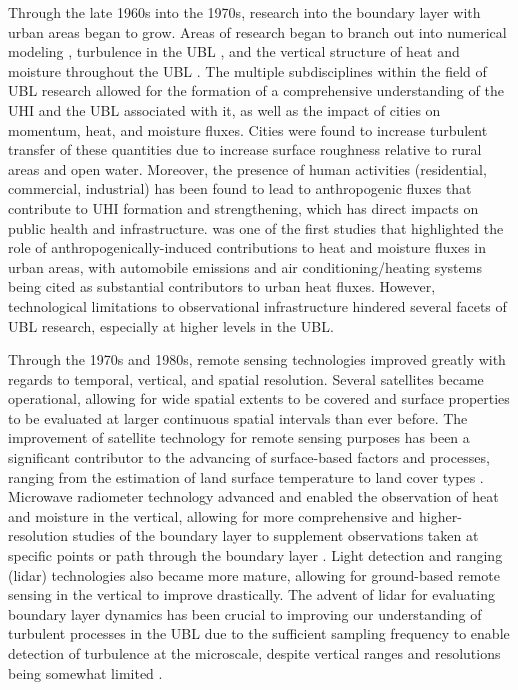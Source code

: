 Through the late 1960s into the 1970s, research into the boundary layer with urban areas began to grow. Areas of research began to branch out into numerical modeling \citep{raman1975physical, atwater1972thermal, yu1975numerical, myrup1969numerical}, turbulence in the UBL \citep{bowne1970observational, gutman1975response, brook1975note}, and the vertical structure of heat and moisture throughout the UBL \citep{hage1975urban, oke1976distinction}. The multiple subdisciplines within the field of UBL research allowed for the formation of a comprehensive understanding of the UHI and the UBL associated with it, as well as the impact of cities on momentum, heat, and moisture fluxes. Cities were found to increase turbulent transfer of these quantities due to increase surface roughness relative to rural areas and open water. Moreover, the presence of human activities (residential, commercial, industrial) has been found to lead to anthropogenic fluxes that contribute to UHI formation and strengthening, which has direct impacts on public health and infrastructure. \citet{oke1975urban} was one of the first studies that highlighted the role of anthropogenically-induced contributions to heat and moisture fluxes in urban areas, with automobile emissions and air conditioning/heating systems being cited as substantial contributors to urban heat fluxes. However, technological limitations to observational infrastructure hindered several facets of UBL research, especially at higher levels in the UBL.

Through the 1970s and 1980s, remote sensing technologies improved greatly with regards to temporal, vertical, and spatial resolution. Several satellites became operational, allowing for wide spatial extents to be covered and surface properties to be evaluated at larger continuous spatial intervals than ever before. The improvement of satellite technology for remote sensing purposes has been a significant contributor to the advancing of surface-based factors and processes, ranging from the estimation of land surface temperature \citep{
carlson1977potential, henderson1980albedo, legeckis1978survey} to land cover types \citep{allan1980remote, townshend1987characterization}. Microwave radiometer technology advanced and enabled the observation of heat and moisture in the vertical, allowing for more comprehensive and higher-resolution studies of the boundary layer to supplement observations taken at specific points or path through the boundary layer \citep{
martner1993evaluation, frisch1995measurement}. Light detection and ranging (lidar) technologies also became more mature, allowing for ground-based remote sensing in the vertical to improve drastically. The advent of lidar for evaluating boundary layer dynamics has been crucial to improving our understanding of turbulent processes in the UBL due to the sufficient sampling frequency to enable detection of turbulence at the microscale, despite vertical ranges and resolutions being somewhat limited \citep{kunkel1977lidar, kopp1984remote, schwiesow1986lidar}.

